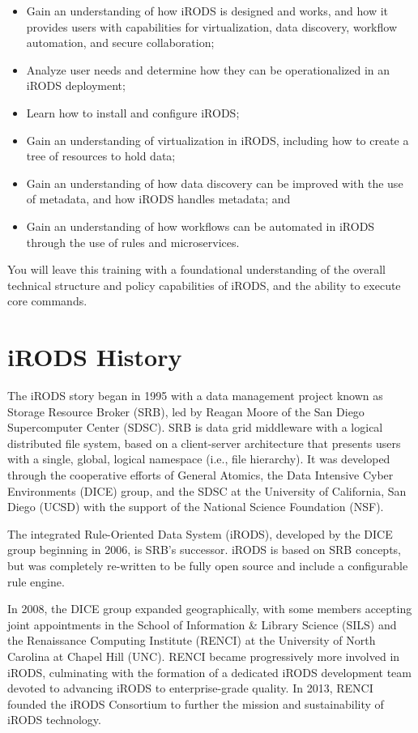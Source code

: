 \documentclass[10pt,oneside]{memoir}
\begin{document}
\begin{itemize}
  \item Gain an understanding of how iRODS is designed and works, and how it provides users with capabilities for virtualization, data discovery, workflow automation, and secure collaboration;
  \item Analyze user needs and determine how they can be operationalized in an iRODS deployment;
  \item Learn how to install and configure iRODS;
  \item Gain an understanding of virtualization in iRODS, including how to create a tree of resources to hold data;
  \item Gain an understanding of how data discovery can be improved with the use of metadata, and how iRODS handles metadata; and
  \item Gain an understanding of how workflows can be automated in iRODS through the use of rules and microservices.
\end{itemize}

You will leave this training with a foundational understanding of the overall technical structure and policy capabilities of iRODS, and the ability to execute core commands.


\newpage
\section{iRODS History}

The iRODS story began in 1995 with a data management project known as Storage Resource Broker (SRB), led by Reagan Moore of the San Diego Supercomputer Center (SDSC). SRB is data grid middleware with a logical distributed file system, based on a client-server architecture that presents users with a single, global, logical namespace (i.e., file hierarchy). It was developed through the cooperative efforts of General Atomics, the Data Intensive Cyber Environments (DICE) group, and the SDSC at the University of California, San Diego (UCSD) with the support of the National Science Foundation (NSF).

The integrated Rule-Oriented Data System (iRODS), developed by the DICE group beginning in 2006, is SRB's successor. iRODS is based on SRB concepts, but was completely re-written to be fully open source and include a configurable rule engine.

In 2008, the DICE group expanded geographically, with some members accepting joint appointments in the School of Information \& Library Science (SILS) and the Renaissance Computing Institute (RENCI) at the University of North Carolina at Chapel Hill (UNC). RENCI became progressively more involved in iRODS, culminating with the formation of a dedicated iRODS development team devoted to advancing iRODS to enterprise-grade quality. In 2013, RENCI founded the iRODS Consortium to further the mission and sustainability of iRODS technology.
\end{document}
